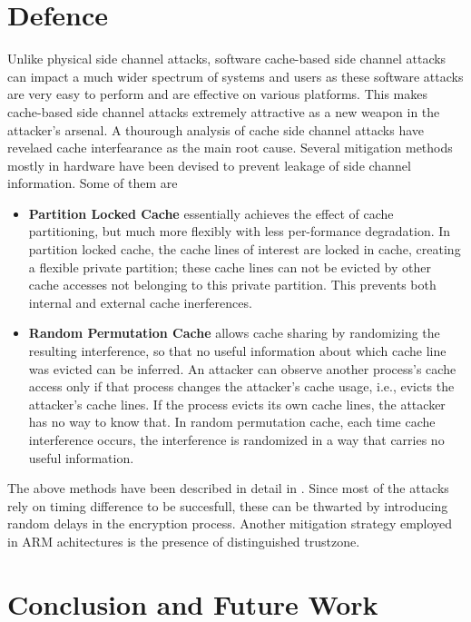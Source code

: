 \documentclass[twocolumn]{IEEEtran}
\begin{document}
\section {Defence}

Unlike physical side channel attacks, software cache-based side channel  attacks can impact a much wider spectrum of systems and users as these software attacks are very easy to perform and are effective on various platforms. This makes cache-based side channel attacks extremely attractive as a new weapon in the attacker’s arsenal. A thourough analysis of cache side channel attacks have revelaed cache interfearance as the main root cause. Several mitigation methods mostly in hardware have been devised to prevent leakage of side channel information. Some of them are

\begin{itemize}
\item \textbf {Partition Locked Cache} essentially achieves the effect of cache partitioning, but much more flexibly with less per-formance degradation. In partition locked cache, the cache lines of interest are locked in cache, creating a flexible private partition; these cache lines can not be evicted by other cache accesses not belonging to this private partition. This prevents both internal and external cache inerferences.

\item \textbf {Random Permutation Cache} allows cache sharing by randomizing the resulting interference, so that no useful information about which cache line was evicted can be inferred. An attacker can observe another process’s cache access only if that process changes the attacker’s cache usage, i.e., evicts the attacker’s cache lines. If the process evicts its own cache lines, the attacker has no way to know that.  In random permutation cache, each time cache interference occurs, the interference is randomized in a way that carries no useful information. 

\end{itemize}

The above methods have been described in detail in \cite{wang2007new}. Since most of the attacks rely on timing difference to be succesfull, these can be thwarted by introducing random delays in the encryption process. Another mitigation strategy employed in ARM achitectures is the presence of distinguished trustzone. 

\section {Conclusion and Future Work}
\end{document}

